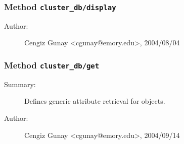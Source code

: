 \methodline%
\subsubsection[Method \texttt{display}]{Method \texttt{cluster\_db/display}}%
%
\label{ref_cluster_db__display}%
\hypertarget{ref_cluster_db__display}{}%
\begin{description}
%
%
%
%
%
%
%
\item[Author:]%
Cengiz Gunay <cgunay@emory.edu>, 2004/08/04
%
\end{description}
\methodline%
\subsubsection[Method \texttt{get}]{Method \texttt{cluster\_db/get}}%
%
\label{ref_cluster_db__get}%
\hypertarget{ref_cluster_db__get}{}%
\begin{description}
\item[Summary:]Defines generic attribute retrieval for objects.
%
%
%
%
%
%
%
\item[Author:]%
Cengiz Gunay <cgunay@emory.edu>, 2004/09/14
%
\end{description}
\methodline%
